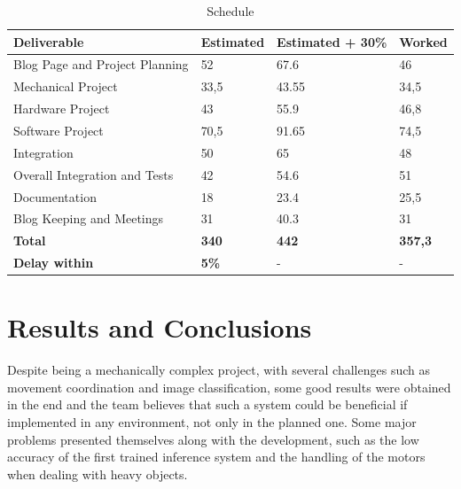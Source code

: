 \documentclass[a4paper,11pt]{article}
\begin{document}
\begin{table}[H]
  \small
  \caption{\small{Schedule}}
  \begin{center}
    \begin{tabular}{|l|l|l|l|}
      \hline
      \textbf{Deliverable}           & \textbf{Estimated} & \textbf{Estimated + 30\%} & \textbf{Worked} \\ \hline
      Blog Page and Project Planning & 52                 & 67.6                      & 46              \\ \hline
      Mechanical Project             & 33,5               & 43.55                     & 34,5            \\ \hline
      Hardware Project               & 43                 & 55.9                      & 46,8            \\ \hline
      Software Project               & 70,5               & 91.65                     & 74,5            \\ \hline
      Integration                    & 50                 & 65                        & 48              \\ \hline
      Overall Integration and Tests  & 42                 & 54.6                      & 51              \\ \hline
      Documentation                  & 18                 & 23.4                      & 25,5            \\ \hline
      Blog Keeping and Meetings      & 31                 & 40.3                      & 31              \\ \hline
      \textbf{Total}                 & \textbf{340}       & \textbf{442}              & \textbf{357,3}  \\ \hline
      \textbf{Delay within}          & \textbf{5\%}       & -                         & -               \\ \hline
    \end{tabular}
  \end{center}
  \label{tab:schedule}
\end{table}

\section{Results and Conclusions}
Despite being a mechanically complex project, with several challenges such as movement coordination and image classification, some good results were obtained in the end and the team believes that such a system could be beneficial if implemented in any environment, not only in the planned one. Some major problems presented themselves along with the development, such as the low accuracy of the first trained inference system and the handling of the motors when dealing with heavy objects.
\end{document}
